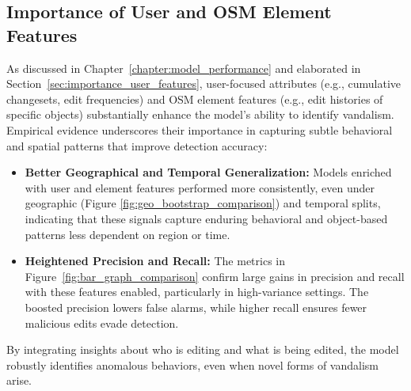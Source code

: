 \documentclass[
    13pt, %
    a4paper, %
    listof=totoc, %
    bibliography=totoc, %
    index=totoc, %
    headsepline
]{scrreprt}
\begin{document}
\subsection{Importance of User and OSM Element Features}
As discussed in Chapter~\ref{chapter:model_performance} and elaborated in Section~\ref{sec:importance_user_features}, user-focused attributes (e.g., cumulative changesets, edit frequencies) and OSM element features (e.g., edit histories of specific objects) substantially enhance the model’s ability to identify vandalism. Empirical evidence underscores their importance in capturing subtle behavioral and spatial patterns that improve detection accuracy:
\begin{itemize}
    \item \textbf{Better Geographical and Temporal Generalization:} Models enriched with user and element features performed more consistently, even under geographic (Figure \ref{fig:geo_bootstrap_comparison}) and temporal splits, indicating that these signals capture enduring behavioral and object-based patterns less dependent on region or time.
    \item \textbf{Heightened Precision and Recall:} The metrics in Figure~\ref{fig:bar_graph_comparison} confirm large gains in precision and recall with these features enabled, particularly in high-variance settings. The boosted precision lowers false alarms, while higher recall ensures fewer malicious edits evade detection.
\end{itemize}
By integrating insights about who is editing and what is being edited, the model robustly identifies anomalous behaviors, even when novel forms of vandalism arise.
\end{document}
